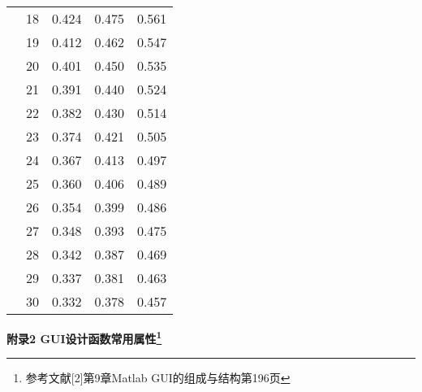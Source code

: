 \begin{tabular}{|p{4cm}<{\centering}|p{2cm}<{\centering}|p{2cm}<{\centering}|p{2cm}<{\centering}|p{2cm}<{\centering}|}
	&18	&0.424	&0.475	&0.561	\\	\cline{2-5}
	&19	&0.412	&0.462	&0.547	\\	\cline{2-5}
	&20	&0.401	&0.450	&0.535	\\	\cline{2-5}
	&21	&0.391	&0.440	&0.524	\\	\cline{2-5}
	&22	&0.382	&0.430	&0.514	\\	\cline{2-5}
	&23	&0.374	&0.421	&0.505	\\	\cline{2-5}
	&24	&0.367	&0.413	&0.497	\\	\cline{2-5}
	&25	&0.360	&0.406	&0.489	\\	\cline{2-5}
	&26	&0.354	&0.399	&0.486	\\	\cline{2-5}
	&27	&0.348	&0.393	&0.475	\\	\cline{2-5}
	&28	&0.342	&0.387	&0.469	\\	\cline{2-5}
	&29	&0.337	&0.381	&0.463	\\	\cline{2-5}
	&30	&0.332	&0.378	&0.457	\\	\hline
\end{tabular}
\newpage
\begin{center}
	\textbf{附录2 GUI设计函数常用属性\footnote{参考文献[2]第9章Matlab GUI的组成与结构第196页}}
\end{center}
